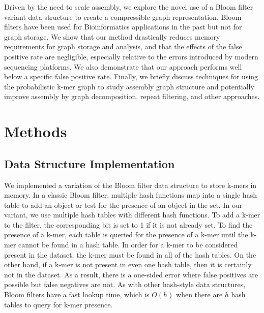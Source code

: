 \documentclass[12pt]{article} \usepackage{simplemargins}
\begin{document}
Driven by the need to scale assembly, we explore the novel use of a 
Bloom filter variant data structure to create a compressible graph 
representation. Bloom filters\cite{bloom} have been used for 
Bioinformatics applications 
in the past\cite{pmid20472541, haskell, pmid20426693} but not for graph 
storage.
We show that our method drastically
reduces memory requirements for graph storage and analysis, and that the effects
of the false positive rate are negligible, especially relative to the errors
introduced by modern sequencing platforms.
We also demonstrate that our 
approach performs well below a specific false positive rate. Finally, we 
briefly discuss techniques for using the probabilistic k-mer graph 
to study assembly graph structure and potentially improve assembly by 
graph decomposition, repeat filtering, and other approaches.

\section{Methods}

\subsection{Data Structure Implementation}
We implemented a variation of the Bloom filter data structure to store k-mers
in memory. In a classic Bloom filter, multiple hash functions map into 
a single hash table to add an object or test for the presence of an object 
in the set. In 
our variant, we use multiple hash tables with different hash functions. 
To add a k-mer to the filter, the corresponding bit is set to 1 
if it is not already set.  
To find the presence of a k-mer, each table is queried for the
presence of a k-mer until the k-mer cannot be found in a hash
table. In order for a k-mer to be considered present in the dataset, 
the k-mer must be found in all of the hash tables. On the other hand, 
if a k-mer is not present in even one hash table, then it is certainly 
not in the dataset. As a result, there is a one-sided error where 
false positives are possible but false negatives are not. As with other 
hash-style data structures, Bloom filters have a
fast lookup time, which is $O(h)$ when there are $h$ hash tables to query
for k-mer presence.
\end{document}
